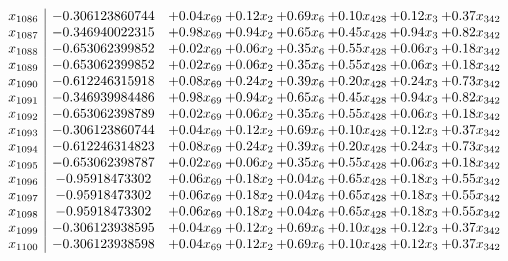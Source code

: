 \documentclass[8pt]{article}
\begin{document}
\[\begin{array}{c| c c@{\hskip 2pt} c@{\hskip 2pt} c@{\hskip 2pt} c@{\hskip 2pt} c@{\hskip 2pt} c@{\hskip 2pt} }
 x_{1086}   &  -0.306123860744 & +  0.04 x_{69} & +  0.12 x_{2} & +  0.69 x_{6} & +  0.10 x_{428} & +  0.12 x_{3} & +  0.37 x_{342}\\
 x_{1087}   &  -0.346940022315 & +  0.98 x_{69} & +  0.94 x_{2} & +  0.65 x_{6} & +  0.45 x_{428} & +  0.94 x_{3} & +  0.82 x_{342}\\
 x_{1088}   &  -0.653062399852 & +  0.02 x_{69} & +  0.06 x_{2} & +  0.35 x_{6} & +  0.55 x_{428} & +  0.06 x_{3} & +  0.18 x_{342}\\
 x_{1089}   &  -0.653062399852 & +  0.02 x_{69} & +  0.06 x_{2} & +  0.35 x_{6} & +  0.55 x_{428} & +  0.06 x_{3} & +  0.18 x_{342}\\
 x_{1090}   &  -0.612246315918 & +  0.08 x_{69} & +  0.24 x_{2} & +  0.39 x_{6} & +  0.20 x_{428} & +  0.24 x_{3} & +  0.73 x_{342}\\
 x_{1091}   &  -0.346939984486 & +  0.98 x_{69} & +  0.94 x_{2} & +  0.65 x_{6} & +  0.45 x_{428} & +  0.94 x_{3} & +  0.82 x_{342}\\
 x_{1092}   &  -0.653062398789 & +  0.02 x_{69} & +  0.06 x_{2} & +  0.35 x_{6} & +  0.55 x_{428} & +  0.06 x_{3} & +  0.18 x_{342}\\
 x_{1093}   &  -0.306123860744 & +  0.04 x_{69} & +  0.12 x_{2} & +  0.69 x_{6} & +  0.10 x_{428} & +  0.12 x_{3} & +  0.37 x_{342}\\
 x_{1094}   &  -0.612246314823 & +  0.08 x_{69} & +  0.24 x_{2} & +  0.39 x_{6} & +  0.20 x_{428} & +  0.24 x_{3} & +  0.73 x_{342}\\
 x_{1095}   &  -0.653062398787 & +  0.02 x_{69} & +  0.06 x_{2} & +  0.35 x_{6} & +  0.55 x_{428} & +  0.06 x_{3} & +  0.18 x_{342}\\
 x_{1096}   &  -0.95918473302 & +  0.06 x_{69} & +  0.18 x_{2} & +  0.04 x_{6} & +  0.65 x_{428} & +  0.18 x_{3} & +  0.55 x_{342}\\
 x_{1097}   &  -0.95918473302 & +  0.06 x_{69} & +  0.18 x_{2} & +  0.04 x_{6} & +  0.65 x_{428} & +  0.18 x_{3} & +  0.55 x_{342}\\
 x_{1098}   &  -0.95918473302 & +  0.06 x_{69} & +  0.18 x_{2} & +  0.04 x_{6} & +  0.65 x_{428} & +  0.18 x_{3} & +  0.55 x_{342}\\
 x_{1099}   &  -0.306123938595 & +  0.04 x_{69} & +  0.12 x_{2} & +  0.69 x_{6} & +  0.10 x_{428} & +  0.12 x_{3} & +  0.37 x_{342}\\
 x_{1100}   &  -0.306123938598 & +  0.04 x_{69} & +  0.12 x_{2} & +  0.69 x_{6} & +  0.10 x_{428} & +  0.12 x_{3} & +  0.37 x_{342}\\

\end{array}\]
\end{document}
